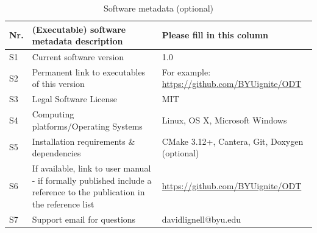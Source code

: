 \documentclass[preprint,12pt, a4paper]{elsarticle}
\begin{document}
\begin{table}[!h]
\begin{tabular}{|l|p{6.5cm}|p{6.5cm}|}
\hline
\textbf{Nr.} & \textbf{(Executable) software metadata description} & \textbf{Please fill in this column} \\
\hline
S1 & Current software version & 1.0 \\
\hline
S2 & Permanent link to executables of this version  & For example: \href{https://github.com/BYUignite/ODT}{https://github.com/BYUignite/ODT} \\
\hline
S3 & Legal Software License & MIT \\
\hline
S4 & Computing platforms/Operating Systems & Linux, OS X, Microsoft Windows\\
\hline
S5 & Installation requirements \& dependencies & CMake 3.12+, Cantera, Git, Doxygen (optional) \\
\hline
S6 & If available, link to user manual - if formally published include a reference to the publication in the reference list & \href{https://github.com/BYUignite/ODT}{https://github.com/BYUignite/ODT}\\
\hline
S7 & Support email for questions & davidlignell@byu.edu \\
\hline
\end{tabular}
\caption{Software metadata (optional)}
\label{t:software}
\end{table}
\end{document}

